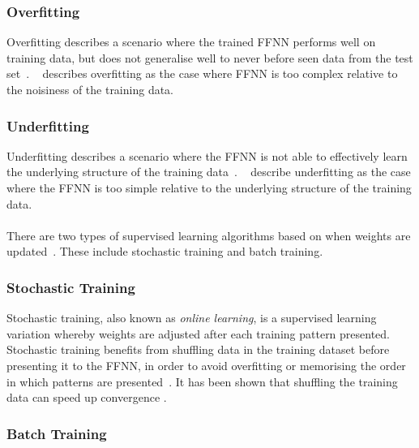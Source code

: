 \subsubsection{Overfitting}\label{sec:anns:training:process:overfitting}

Overfitting describes a scenario where the trained \acs{FFNN} performs well on training data, but does not generalise well to never before seen data from the test set~\cite{ref:tetko:1995, ref:geron:2017}. \citeauthor{ref:geron:2017}~\cite{ref:geron:2017} describes overfitting as the case where \acs{FFNN} is too complex relative to the noisiness of the training data.

\subsubsection{Underfitting}\label{sec:anns:training:process:underfitting}

Underfitting describes a scenario where the \acs{FFNN} is not able to effectively learn the underlying structure of the training data~\cite{ref:tetko:1995, ref:geron:2017}. \citeauthor{ref:geron:2017}~\cite{ref:geron:2017} describe underfitting as the case where the \acs{FFNN} is too simple relative to the underlying structure of the training data.\\
\\
There are two types of supervised learning algorithms based on when weights are updated~\cite{ref:engelbrecht:2007}. These include stochastic training and batch
training.


\subsubsection{Stochastic Training}\label{sec:anns:training:stochastic}

Stochastic training, also known as \textit{online learning}, is a supervised learning variation whereby weights are adjusted after each training pattern presented. Stochastic training benefits from shuffling data in the training dataset before presenting it to the \acs{FFNN}, in order to avoid overfitting or memorising the order in which patterns are presented~\cite{ref:engelbrecht:2007}. It has been shown that shuffling the training data can speed up convergence
\cite{ref:bengio:2012}.


\subsubsection{Batch Training}\label{sec:anns:training:batch}

